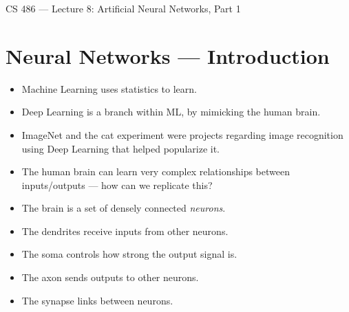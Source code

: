 \documentclass{article}
\author{Clement Tsang}
\begin{document}
\begin{center}
    \Large{CS 486 --- Lecture 8: Artificial Neural Networks, Part 1}
\end{center}

\section{Neural Networks --- Introduction}
\begin{itemize}
    \item Machine Learning uses statistics to learn.
    \item Deep Learning is a branch within ML, by mimicking the human brain.
    \item ImageNet and the cat experiment were projects regarding image recognition using Deep Learning that helped popularize it.
    \item The human brain can learn very complex relationships between inputs/outputs --- how can we replicate this?
    \item The brain is a set of densely connected \emph{neurons}.
    \item The dendrites receive inputs from other neurons.
    \item The soma controls how strong the output signal is.
    \item The axon sends outputs to other neurons.
    \item The synapse links between neurons.
\end{itemize}
\end{document}
